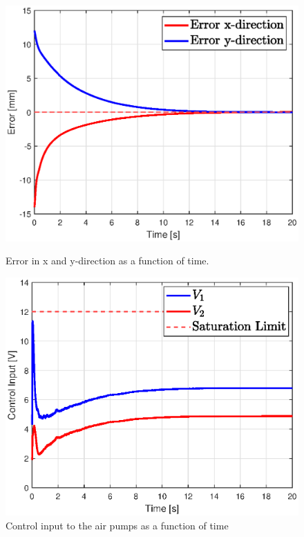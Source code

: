 \begin{figure}[H]
    \centering
\begin{minipage}{0.5\textwidth}
        \centering
        \includegraphics[width=\textwidth]{Figures/Chapter5/stepsimerror.eps} 
        \caption{Error in x and y-direction as a function of time.}
        \label{fig5:errorsim}
    \end{minipage}\hfill
    \begin{minipage}{0.5\textwidth}
        \centering
        \includegraphics[width=\textwidth]{Figures/Chapter5/stepsiminputV.eps} 
        \caption{Control input to the air pumps as a function of time}
        \label{fig5:controlinputsim}
    \end{minipage}
\end{figure}


